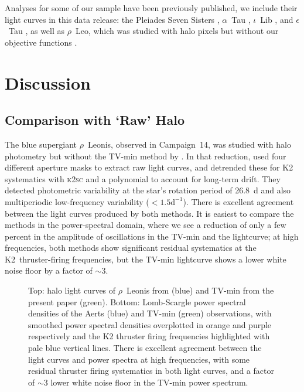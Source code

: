 \documentclass[modern]{aastex62}
\begin{document}


Analyses for some of our sample have been previously published, we include their light curves in this data release: the Pleiades Seven Sisters \citep{White2017}, $\alpha$~Tau \citep[Aldebaran;][]{Farr2018}, $\iota$~Lib \citep{Buysschaert2018}, and $\epsilon$~Tau \citep{Arentoft2019}, as well as $\rho$~Leo, which was studied with halo pixels but without our objective functions \citep{Aerts2018}.


\section{Discussion}
\label{sec:discussion}

\subsection{Comparison with `Raw' Halo}
\label{raw}

The blue supergiant $\rho$~Leonis, observed in Campaign~14, was studied with halo photometry but without the TV-min method by \citet{Aerts2018}. In that reduction, \citet{Aerts2018} used four different aperture masks to extract raw light curves, and detrended these for K2 systematics with \textsc{k2sc} and a polynomial to account for long-term drift. They detected photometric variability at the star's rotation period of 26.8~d and also multiperiodic low-frequency variability ($<1.5 \text{d}^{-1}$). There is excellent agreement between the light curves produced by both methods. It is easiest to compare the methods in the power-spectral domain, where we see a reduction of only a few percent in the amplitude of oscillations in the TV-min and the \citet{Aerts2018} lightcurve; at high frequencies, both methods show significant residual systematics at the K2~thruster-firing frequencies, but the TV-min lightcurve shows a lower white noise floor by a factor of $\sim 3$. 

\begin{figure}
\caption{Top: halo light curves of $\rho$~Leonis from \citet{Aerts2018} (blue) and TV-min from the present paper (green). Bottom: Lomb-Scargle power spectral densities of the Aerts (blue) and TV-min (green) observations, with smoothed power spectral densities overplotted in orange and purple respectively and the K2 thruster firing frequencies highlighted with pale blue vertical lines. There is excellent agreement between the light curves and power spectra at high frequencies, with some residual thruster firing systematics in both light curves, and a factor of $\sim 3$ lower white noise floor in the TV-min power spectrum.}
\label{rholeo_comparison}
\end{figure}
\end{document}
